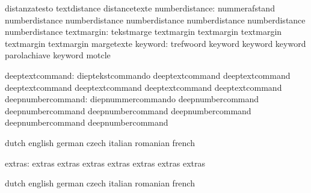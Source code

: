                            distanzatesto             textdistance
                           distancetexte
           numberdistance: nummerafstand             numberdistance
                           numberdistance            numberdistance
                           numberdistance            numberdistance
                           numberdistance
               textmargin: tekstmarge                textmargin
                           textmargin                textmargin
                           textmargin                textmargin
                           margetexte
                  keyword: trefwoord                 keyword
                           keyword                   keyword
                           parolachiave              keyword
                           motcle

          deeptextcommand: dieptekstcommando         deeptextcommand
                           deeptextcommand           deeptextcommand
                           deeptextcommand           deeptextcommand
                           deeptextcommand
        deepnumbercommand: diepnummercommando        deepnumbercommand
                           deepnumbercommand         deepnumbercommand
                           deepnumbercommand         deepnumbercommand
                           deepnumbercommand

\stopconstants


\startconstants            dutch                     english
                           german                    czech
                           italian                   romanian
                           french

                   extras: extras                    extras
                           extras                    extras
                           extras                    extras
                           extras

\stopconstants




\startvariables            dutch                     english
                           german                    czech
                           italian                   romanian
                           french

